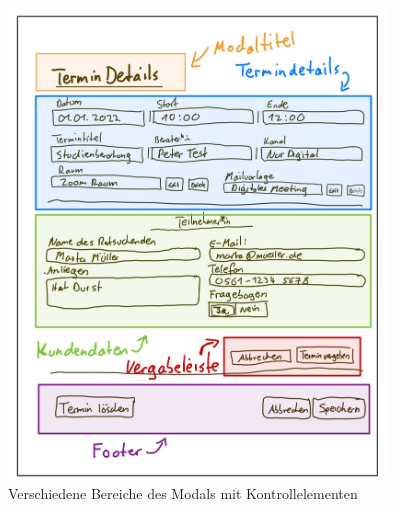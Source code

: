 \documentclass[12pt]{article}
\begin{document}
\begin{figure}[h]
    \caption{Verschiedene Bereiche des Modals mit Kontrollelementen}
    \centering
    \includegraphics[width=0.9\textwidth]{doodle_modal_overview.jpeg}
\end{figure}
\end{document}
